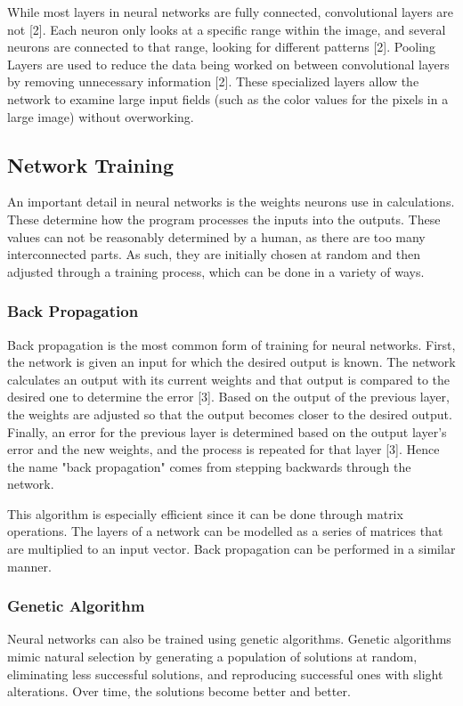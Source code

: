 \documentclass[10pt,journal,compsoc, draftclsnofoot,onecolumn]{IEEEtran}
\begin{document}
While most layers in neural networks are fully connected, convolutional layers are not [2]. Each neuron
only looks at a specific range within the image, and several neurons are connected to that range, looking for
different patterns [2]. Pooling Layers are used to reduce the data being worked on between convolutional layers
by removing unnecessary information [2]. These specialized layers allow the network to examine large input
fields (such as the color values for the pixels in a large image) without overworking.

\subsection{Network Training}
An important detail in neural networks is the weights neurons use in calculations. These determine how the
program processes the inputs into the outputs. These values can not be reasonably determined by a human, as
there are too many interconnected parts. As such, they are initially chosen at random and then adjusted through
a training process, which can be done in a variety of ways.

\subsubsection{Back Propagation}
Back propagation is the most common form of training for neural networks. First, the network is given an input
for which the desired output is known. The network calculates an output with its current weights and that
output is compared to the desired one to determine the error [3]. Based on the output of the previous layer, the
weights are adjusted so that the output becomes closer to the desired output. Finally, an error for the previous
layer is determined based on the output layer's error and the new weights, and the process is repeated for that
layer [3]. Hence the name "back propagation" comes from stepping backwards through the network.

This algorithm is especially efficient since it can be done through matrix operations. The layers of a network
can be modelled as a series of matrices that are multiplied to an input vector. Back propagation can be performed
in a similar manner.

\subsubsection{Genetic Algorithm}
Neural networks can also be trained using genetic algorithms. Genetic algorithms mimic natural selection
by generating a population of solutions at random, eliminating less successful solutions, and reproducing
successful ones with slight alterations. Over time, the solutions become better and better.
\end{document}

